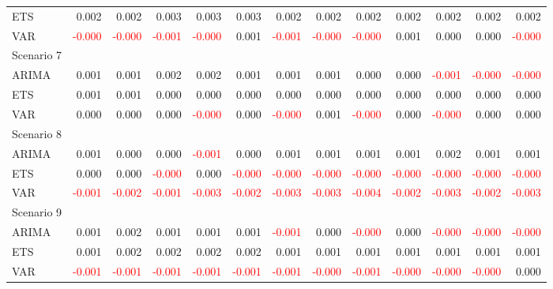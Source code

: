 \begin{table}[!htb]
{\begin{tabular}{lrrrrrrrrrrrr}
      ETS & 0.002 & 0.002 & 0.003 & 0.003 & 0.003 & 0.002 & 0.002 & 0.002 & 0.002 & 0.002 & 0.002 & 0.002 \\
      VAR & \textcolor{red}{-0.000} & \textcolor{red}{-0.000} & \textcolor{red}{-0.001} & \textcolor{red}{-0.000} & 0.001 & \textcolor{red}{-0.001} & \textcolor{red}{-0.000} & \textcolor{red}{-0.000} & 0.001 & 0.000 & 0.000 & \textcolor{red}{-0.000} \\
      \hline
      Scenario 7 & & & & & & & & & & & & \\
      \hline
      ARIMA & 0.001 & 0.001 & 0.002 & 0.002 & 0.001 & 0.001 & 0.001 & 0.000 & 0.000 & \textcolor{red}{-0.001} & \textcolor{red}{-0.000} & \textcolor{red}{-0.000} \\
      ETS & 0.001 & 0.001 & 0.000 & 0.000 & 0.000 & 0.000 & 0.000 & 0.000 & 0.000 & 0.000 & 0.000 & 0.000 \\
      VAR & 0.000 & 0.000 & 0.000 & \textcolor{red}{-0.000} & 0.000 & \textcolor{red}{-0.000} & 0.001 & \textcolor{red}{-0.000} & 0.000 & \textcolor{red}{-0.000} & 0.000 & 0.000 \\
      \hline
      Scenario 8 & & & & & & & & & & & & \\
      \hline
      ARIMA & 0.001 & 0.000 & 0.000 & \textcolor{red}{-0.001} & 0.000 & 0.001 & 0.001 & 0.001 & 0.001 & 0.002 & 0.001 & 0.001 \\
      ETS & 0.000 & 0.000 & \textcolor{red}{-0.000} & 0.000 & \textcolor{red}{-0.000} & \textcolor{red}{-0.000} & \textcolor{red}{-0.000} & \textcolor{red}{-0.000} & \textcolor{red}{-0.000} & \textcolor{red}{-0.000} & \textcolor{red}{-0.000} & \textcolor{red}{-0.000} \\
      VAR & \textcolor{red}{-0.001} & \textcolor{red}{-0.002} & \textcolor{red}{-0.001} & \textcolor{red}{-0.003} & \textcolor{red}{-0.002} & \textcolor{red}{-0.003} & \textcolor{red}{-0.003} & \textcolor{red}{-0.004} & \textcolor{red}{-0.002} & \textcolor{red}{-0.003} & \textcolor{red}{-0.002} & \textcolor{red}{-0.003} \\
      \hline
      Scenario 9 & & & & & & & & & & & & \\
      \hline
      ARIMA & 0.001 & 0.002 & 0.001 & 0.001 & 0.001 & \textcolor{red}{-0.001} & 0.000 & \textcolor{red}{-0.000} & 0.000 & \textcolor{red}{-0.000} & \textcolor{red}{-0.000} & \textcolor{red}{-0.000} \\
      ETS & 0.001 & 0.002 & 0.002 & 0.002 & 0.002 & 0.001 & 0.001 & 0.001 & 0.001 & 0.001 & 0.001 & 0.001 \\
      VAR & \textcolor{red}{-0.001} & \textcolor{red}{-0.001} & \textcolor{red}{-0.001} & \textcolor{red}{-0.001} & \textcolor{red}{-0.001} & \textcolor{red}{-0.001} & \textcolor{red}{-0.000} & \textcolor{red}{-0.001} & \textcolor{red}{-0.000} & \textcolor{red}{-0.000} & \textcolor{red}{-0.000} & 0.000 \\
      \hline
    \end{tabular}%
  }
  \label{tab:sh_uni_mean}
\end{table}
